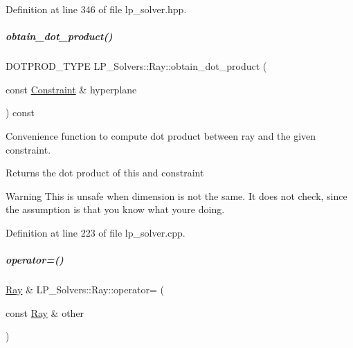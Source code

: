 Definition at line 346 of file lp\+\_\+solver.\+hpp.

\mbox{\label{group___c_l_s_solvers_a431363fc157d5a8df8b180ac671e19ea}} 
\subparagraph{\texorpdfstring{obtain\+\_\+dot\+\_\+product()}{obtain\_dot\_product()}}
{\footnotesize\ttfamily D\+O\+T\+P\+R\+O\+D\+\_\+\+T\+Y\+PE L\+P\+\_\+\+Solvers\+::\+Ray\+::obtain\+\_\+dot\+\_\+product (\begin{DoxyParamCaption}\item[{const \hyperlink{group___c_l_s_solvers_class_l_p___solvers_1_1_constraint}{Constraint} \&}]{hyperplane }\end{DoxyParamCaption}) const}



Convenience function to compute dot product between ray and the given constraint. 

\begin{DoxyReturn}{Returns}
the dot product of {\ttfamily this} and {\ttfamily constraint} 
\end{DoxyReturn}
\begin{DoxyWarning}{Warning}
This is unsafe when dimension is not the same. It does not check, since the assumption is that you know what you\textquotesingle{}re doing. 
\end{DoxyWarning}


Definition at line 223 of file lp\+\_\+solver.\+cpp.

\mbox{\label{group___c_l_s_solvers_ae70a9ad73b8788c53e0b1cc7c2cdae27}} 
\subparagraph{\texorpdfstring{operator=()}{operator=()}}
{\footnotesize\ttfamily \hyperlink{group___c_l_s_solvers_class_l_p___solvers_1_1_ray}{Ray} \& L\+P\+\_\+\+Solvers\+::\+Ray\+::operator= (\begin{DoxyParamCaption}\item[{const \hyperlink{group___c_l_s_solvers_class_l_p___solvers_1_1_ray}{Ray} \&}]{other }\end{DoxyParamCaption})}



